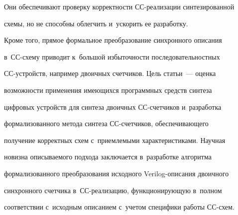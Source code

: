 Они обеспечивают проверку кор\-рект\-ности СС-ре\-а\-ли\-за\-ции синтезированной 

схемы, но не способны об\-лег\-чить и~ускорить ее разработку.

  

  Кроме того, прямое формальное преобразование синхронного описания 

  в~СС-схе\-му приводит к~большой из\-бы\-точ\-ности последовательностных  

СС-устройств, например двоичных счетчиков. Цель \mbox{статьи}~--- оценка 

воз\-мож\-ности применения име\-ющих\-ся программных средств синтеза 

циф\-ро\-вых устройств для синтеза двоичных \mbox{СС-счет}\-чи\-ков и~разработка 

формализованного метода синтеза \mbox{СС-счет}\-чи\-ков, обеспечивающего 

получение корректных схем с~приемлемыми характеристиками. Научная 

новизна опи\-сы\-ва\-емо\-го подхода заключается в~разработке алгоритма 

формализованного преобразования исходного Verilog-опи\-са\-ния двоичного 

синхронного счетчика в~СС-ре\-а\-ли\-за\-цию, функ\-ци\-о\-ни\-ру\-ющую в~полном 

соответствии с~исходным описанием с~учетом специфики работы СС-схем.



